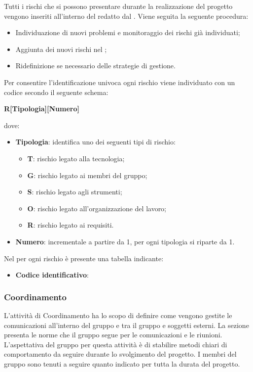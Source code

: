 Tutti i rischi che si possono presentare durante la realizzazione del progetto vengono inseriti all'interno del \PdP redatto dal \Responsabile.
Viene seguita la seguente procedura:
\begin{itemize}
	\item Individuazione di nuovi problemi e monitoraggio dei rischi già individuati;
	\item Aggiunta dei nuovi rischi nel \PdPv;
	\item Ridefinizione se necessario delle strategie di gestione.
\end{itemize}
Per consentire l'identificazione univoca ogni rischio viene individuato con un codice secondo il seguente schema:
\begin{center}
	\textbf{R[Tipologia][Numero]}
\end{center}
dove: 
\begin{itemize}
	\item \textbf{Tipologia}: identifica uno dei seguenti tipi di rischio:
		\begin{itemize}
			\item \textbf{T}: rischio legato alla tecnologia;
			\item \textbf{G}: rischio legato ai membri del gruppo;
			\item \textbf{S}: rischio legato agli strumenti;
			\item \textbf{O}: rischio legato all'organizzazione del lavoro;
			\item \textbf{R}: rischio legato ai requisiti.
		\end{itemize}
	\item \textbf{Numero}: incrementale a partire da 1, per ogni tipologia si riparte da 1.
\end{itemize}
Nel \PdPv  per ogni rischio è presente una tabella indicante:
\begin{itemize}
	\item \textbf{Codice identificativo}:
\end{itemize}


\subsubsection{Coordinamento}
L'attività di Coordinamento ha lo scopo di definire come vengono gestite le comunicazioni all'interno del gruppo \Gruppo e tra il gruppo e soggetti esterni.
La sezione presenta le norme che il gruppo segue per le comunicazioni e le riunioni.
L'aspettativa del gruppo per questa attività è di stabilire metodi chiari di comportamento da seguire durante lo svolgimento del progetto.
 I membri del gruppo sono tenuti a seguire quanto indicato per tutta la durata del progetto.
